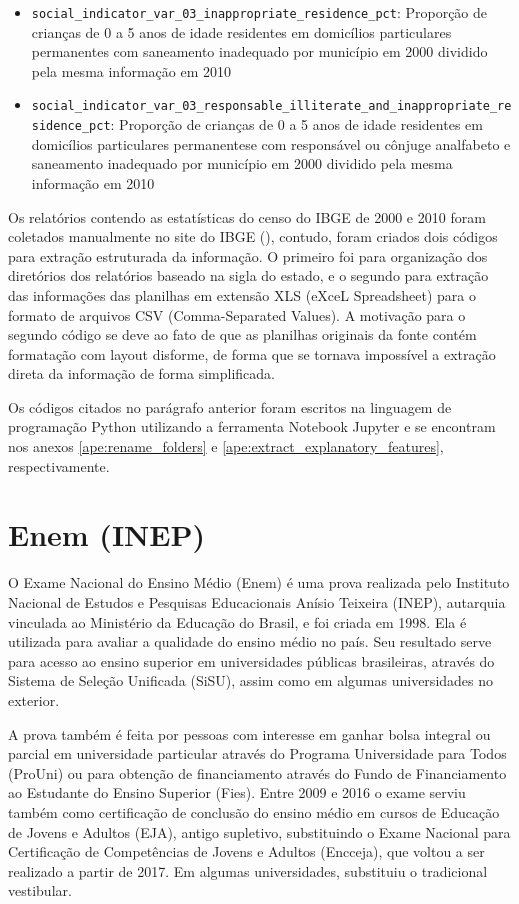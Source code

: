 \begin{itemize}
	\item \verb|social_indicator_var_03_inappropriate_residence_pct|: Proporção de crianças de 0 a 5 anos de idade residentes em domicílios particulares permanentes com saneamento inadequado por município em 2000 dividido pela mesma informação em 2010
	\item \verb|social_indicator_var_03_responsable_illiterate_and_inappropriate_residence_pct|: Proporção de crianças de 0 a 5 anos de idade residentes em domicílios particulares permanentese com responsável ou cônjuge analfabeto e saneamento inadequado por município em 2000 dividido pela mesma informação em 2010
\end{itemize}

Os relatórios contendo as estatísticas do censo do IBGE de 2000 e 2010 foram coletados manualmente no site do IBGE (\citet{IBGE}), contudo, foram criados dois códigos para extração estruturada da informação. O primeiro foi para organização dos diretórios dos relatórios baseado na sigla do estado, e o segundo para extração das informações das planilhas em extensão XLS (eXceL Spreadsheet) para o formato de arquivos CSV (Comma-Separated Values). A motivação para o segundo código se deve ao fato de que as planilhas originais da fonte contém formatação com layout disforme, de forma que se tornava impossível a extração direta da informação de forma simplificada.

Os códigos citados no parágrafo anterior foram escritos na linguagem de programação Python utilizando a ferramenta Notebook Jupyter e se encontram nos anexos \ref{ape:rename_folders} e \ref{ape:extract_explanatory_features}, respectivamente.

\section{Enem (INEP)}
\label{sec:enem_inep}

O Exame Nacional do Ensino Médio (Enem) é uma prova realizada pelo Instituto Nacional de Estudos e Pesquisas Educacionais Anísio Teixeira (INEP), autarquia vinculada ao Ministério da Educação do Brasil, e foi criada em 1998. Ela é utilizada para avaliar a qualidade do ensino médio no país. Seu resultado serve para acesso ao ensino superior em universidades públicas brasileiras, através do Sistema de Seleção Unificada (SiSU), assim como em algumas universidades no exterior.

A prova também é feita por pessoas com interesse em ganhar bolsa integral ou parcial em universidade particular através do Programa Universidade para Todos (ProUni) ou para obtenção de financiamento através do Fundo de Financiamento ao Estudante do Ensino Superior (Fies). Entre 2009 e 2016 o exame serviu também como certificação de conclusão do ensino médio em cursos de Educação de Jovens e Adultos (EJA), antigo supletivo, substituindo o Exame Nacional para Certificação de Competências de Jovens e Adultos (Encceja), que voltou a ser realizado a partir de 2017. Em algumas universidades, substituiu o tradicional vestibular.

